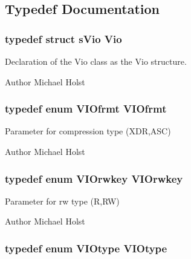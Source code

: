 \subsection{Typedef Documentation}
\subsubsection[{Vio}]{\setlength{\rightskip}{0pt plus 5cm}typedef struct {\bf s\+Vio} {\bf Vio}}\label{a00028_ga277550356f3dd78c988516b1e172a9c6}


Declaration of the Vio class as the Vio structure. 

\begin{DoxyAuthor}{Author}
Michael Holst 
\end{DoxyAuthor}
\subsubsection[{V\+I\+Ofrmt}]{\setlength{\rightskip}{0pt plus 5cm}typedef enum {\bf V\+I\+Ofrmt}  {\bf V\+I\+Ofrmt}}\label{a00028_ga163ab2afe12d8f6739822eac4933da1d}


Parameter for compression type (X\+D\+R,A\+S\+C) 

\begin{DoxyAuthor}{Author}
Michael Holst 
\end{DoxyAuthor}
\subsubsection[{V\+I\+Orwkey}]{\setlength{\rightskip}{0pt plus 5cm}typedef enum {\bf V\+I\+Orwkey}  {\bf V\+I\+Orwkey}}\label{a00028_ga657e164038235f4739ea0ee41b9e368d}


Parameter for rw type (R,R\+W) 

\begin{DoxyAuthor}{Author}
Michael Holst 
\end{DoxyAuthor}
\subsubsection[{V\+I\+Otype}]{\setlength{\rightskip}{0pt plus 5cm}typedef enum {\bf V\+I\+Otype}  {\bf V\+I\+Otype}}\label{a00028_gaf946e6d7d3ed8f5bdb3de70792477fa4}


